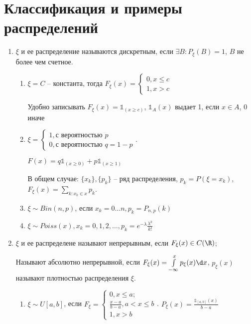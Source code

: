 \section{Классификация и примеры распределений}
\begin{enumerate}[label=\Roman*.]
    \item $\xi$ и ее распределение называются дискретным, если $\exists B\colon P_{\xi}(B) = 1$, $B$ не более чем счетное.
    \begin{enumerate}[label=\arabic*.]
    \item $\xi = C$ -- константа, тогда $F_{\xi}(x) = \begin{cases} 0, x \leq c \\ 1, x > c\end{cases}$
    \begin{Rem}
        Удобно записывать $F_{\xi}(x) = \mathbb{1}_(x \geq c)$, $\mathbb{1}_A (x)$ выдает 1, если $x \in A$, 0 иначе
    \end{Rem}   
    \item $\xi = \begin{cases} 1, \text{с вероятностью } p \\ 0, \text{с вероятностью } q = 1 - p\end{cases}$.

    $F(x) = q \mathbb{1}_{(x \geq 0)} + p \mathbb{1}_{(x \geq 1)}$

    В общем случае: $\{x_k\}, \{p_k\}$ -- ряд распределения, $p_k = P(\xi = x_k)$, $F_{\xi}(x) = \sum\limits_{k\colon x_k \in x} p_k$.

    \item
    $\xi \sim Bin(n, p)$, если $x_k = 0 \dots n, p_k = P_{n,p}(k)$

    \item
    $\xi \sim Poiss(x), x_k = 0, 1, 2, \dots, p_k = e^{-\lambda} \frac{\lambda^k}{k!}$
    \end{enumerate}
    \item $\xi$ и ее распределене называют непрерывным, если $F_{\xi}(x) \in C(\R)$; 
    
    Называют абсолютно непрерывной, если $F_{\xi}(x) =\int\limits_{-\infty}^{x} p_{\xi}(x) \d x$, $p_{\xi}(x)$ называют плотностью распределения $\xi$.

    \begin{enumerate}[label=\arabic*.]
    \item $\xi \sim U[a, b]$, если $F_{\xi} = \begin{cases} 0, x \leq a; \\ \frac{x - a}{b - a}, a < x \leq b \\ 1, x > b\end{cases}$. 
        $P_{\xi}(x) = \frac{\mathbb{1}_{[a, b]}(x)}{b - a}$


\end{enumerate}
\end{enumerate}
